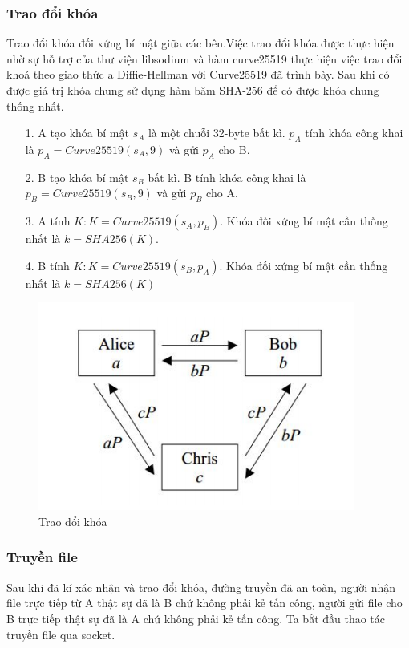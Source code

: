 \documentclass[a4paper,12pt]{report}
\begin{document}
\subsubsection*{Trao đổi khóa}
Trao đổi khóa đối xứng bí mật giữa các bên.Việc trao đổi khóa được thực hiện nhờ sự hỗ trợ của thư viện libsodium và hàm curve25519 thực hiện việc trao đổi khoá theo giao thức a Diffie-Hellman với Curve25519 đã trình bày. Sau khi có được giá trị khóa chung sử dụng hàm băm SHA-256 để có được khóa chung thống nhất.
\begin{itemize}
\item[1. ] A tạo khóa bí mật $s_A$ là một chuỗi 32-byte bất kì. $p_A$ tính khóa công khai là $p_A = Curve25519(s_A, 9)$ và gửi $p_A$ cho B.
\item[2. ] B tạo khóa bí mật $s_B$ bất kì. B tính khóa công khai là $p_B = Curve25519(s_B, 9)$ và gửi $p_B$ cho A.
\item[3. ] A tính $K: K = Curve25519(s_A, p_B)$. Khóa đối xứng bí mật cần thống nhất là $k = SHA256(K)$.
\item[4. ] B tính $K: K = Curve25519(s_B, p_A)$. Khóa đối xứng bí mật cần thống nhất là $k = SHA256(K)$
\end{itemize}
\begin{center}
\begin{figure}[H]
\centering
\includegraphics[width=0.65\linewidth]{../im22.png}
\caption{Trao đổi khóa}
\end{figure}
\end{center}
\subsubsection*{Truyền file}
Sau khi đã kí xác nhận và trao đổi khóa, đường truyền đã an toàn, người nhận file trực tiếp từ A thật sự đã là B chứ không phải kẻ tấn công, người gửi file cho B trực tiếp thật sự đã là A chứ không phải kẻ tấn công. Ta bắt đầu thao tác truyền file qua socket. 
\end{document}
